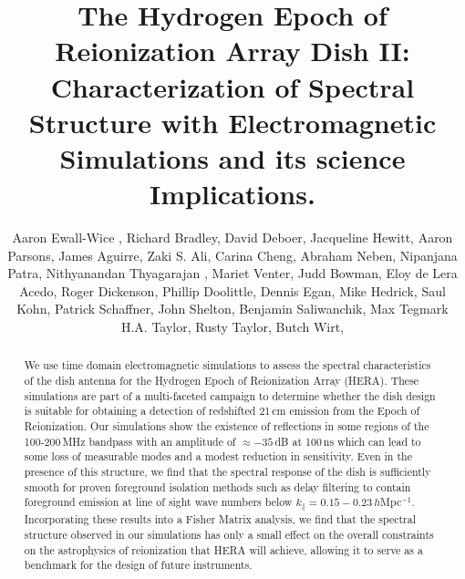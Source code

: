 \documentclass[twocolumn]{emulateapj}
\begin{document}
\title{The Hydrogen Epoch of Reionization Array Dish II: Characterization of Spectral Structure with Electromagnetic  Simulations and its science Implications.}
\author{
Aaron Ewall-Wice ,
Richard Bradley,
David Deboer,
Jacqueline Hewitt,
Aaron Parsons,
James Aguirre,
Zaki S. Ali,
Carina Cheng,
Abraham Neben,
Nipanjana Patra,
Nithyanandan Thyagarajan ,
Mariet Venter,
Judd Bowman,
Eloy de Lera Acedo,
Roger Dickenson,
Phillip Doolittle,
Dennis Egan,
Mike Hedrick,
Saul Kohn,
Patrick Schaffner,
John Shelton,
Benjamin Saliwanchik,
Max Tegmark
H.A. Taylor,
Rusty Taylor,
Butch Wirt,
}

\begin{abstract}
We use time domain electromagnetic simulations to assess the spectral characteristics of the dish antenna for the Hydrogen Epoch of Reionization Array (HERA). These simulations are part of a multi-faceted campaign to determine whether the dish design is suitable for obtaining a detection of redshifted 21\,cm emission from the Epoch of Reionization. Our simulations show the existence of reflections in some regions of the 100-200\,MHz bandpass with an amplitude of $\approx -35$\,dB at 100\,ns which can lead to some loss of measurable modes and a modest reduction in sensitivity. Even in the presence of this structure, we find that the spectral response of the dish is sufficiently smooth for proven foreground isolation methods such as delay filtering to contain foreground emission at line of sight wave numbers below $k_\parallel = 0.15-0.23$\,$h$Mpc$^{-1}$. Incorporating these results into a Fisher Matrix analysis, we find that the spectral structure observed in our simulations has only a small effect on the overall constraints on the astrophysics of reionization that HERA will achieve, allowing it to serve as a benchmark for the design of future instruments.%
\end{abstract}
\end{document}
